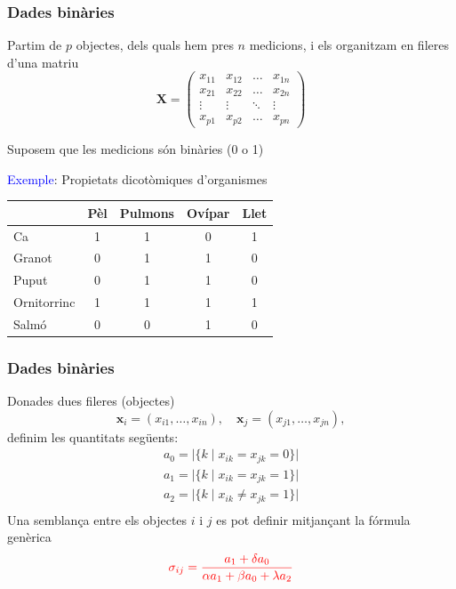 \documentclass[12pt,t]{beamer}
\newcommand{\red}[1]{\textcolor{red}{#1}}
\newcommand{\blue}[1]{\textcolor{blue}{#1}}
\renewcommand{\emph}[1]{{\color{red}#1}}
\theoremstyle{plain}
\theoremstyle{definition}
\begin{document}
\begin{frame}
\frametitle{Dades binàries}
Partim de $p$ objectes, dels quals hem pres $n$ medicions, i els organitzam en fileres d'una matriu
$$
\mathbf{X}=
\begin{pmatrix}
x_{11}&x_{12}&\ldots&x_{1n} \\ 
x_{21}&x_{22}&\ldots&x_{2n} \\
\vdots&\vdots&\ddots&\vdots \\
x_{p1}&x_{p2}&\ldots&x_{pn}
\end{pmatrix}
$$

Suposem que les medicions són \emph{binàries} (0 o 1)\medskip

\blue{Exemple}:  Propietats dicotòmiques  d'organismes
\begin{center}
  \begin{tabular}{l|cccc}
& Pèl & Pulmons & Ovípar & Llet \\
\hline
Ca & 1 & 1 & 0 & 1\\
Granot & 0 & 1 & 1 & 0\\
Puput & 0 & 1 & 1 &0\\
Ornitorrinc & 1 & 1 & 1 & 1\\
Salmó & 0 & 0 & 1 & 0\\
\end{tabular}
\end{center}

\end{frame}

\begin{frame}
\frametitle{Dades binàries}
Donades dues fileres (objectes)
$$
\mathbf{x}_i=(x_{i1},\ldots,x_{in}),\quad \mathbf{x}_j=(x_{j1},\ldots,x_{jn}),
$$
definim les quantitats següents:
$$
\begin{array}{l}
a_0 = \big|\{k\mid x_{ik}=x_{jk}=0\}\big|\\[1ex]
a_1 =\big|\{k\mid x_{ik}=x_{jk}=1\}\big| \\[1ex]
a_2 = \big|\{k\mid x_{ik}\neq x_{jk}=1\}\big| \\[1ex]
\end{array}
$$
Una semblança entre els objectes $i$ i $j$ es pot definir mitjançant la fórmula genèrica
$$
\red{\sigma_{ij}=\frac{a_1 + \delta a_0}{\alpha a_1 + \beta a_0 +\lambda a_2}}
$$
\end{frame}
\end{document}
